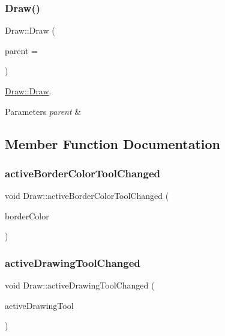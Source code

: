 \subsubsection{\texorpdfstring{Draw()}{Draw()}}
{\footnotesize\ttfamily Draw\+::\+Draw (\begin{DoxyParamCaption}\item[{Q\+Object $\ast$}]{parent = {} }\end{DoxyParamCaption})\hspace{0.3cm}{\ttfamily [explicit]}}



\hyperlink{class_draw_aaad70829cedc40ada59d620bf075e27d}{Draw\+::\+Draw}. 


\begin{DoxyParams}{Parameters}
{\em parent} & \\
\hline
\end{DoxyParams}


\subsection{Member Function Documentation}
\mbox{\label{class_draw_aeafc6ac98a670e97b047bc34d7a13141}} 
\subsubsection{\texorpdfstring{active\+Border\+Color\+Tool\+Changed}{activeBorderColorToolChanged}}
{\footnotesize\ttfamily void Draw\+::active\+Border\+Color\+Tool\+Changed (\begin{DoxyParamCaption}\item[{Q\+Color}]{border\+Color }\end{DoxyParamCaption})\hspace{0.3cm}{\ttfamily [signal]}}

\mbox{\label{class_draw_a65056d377baf1383f8af678ba2ed1467}} 
\subsubsection{\texorpdfstring{active\+Drawing\+Tool\+Changed}{activeDrawingToolChanged}}
{\footnotesize\ttfamily void Draw\+::active\+Drawing\+Tool\+Changed (\begin{DoxyParamCaption}\item[{\hyperlink{class_draw_aef97a848de7a634c35c3ce678be88b9b}{Draw\+::\+Tool}}]{active\+Drawing\+Tool }\end{DoxyParamCaption})\hspace{0.3cm}{\ttfamily [signal]}}

